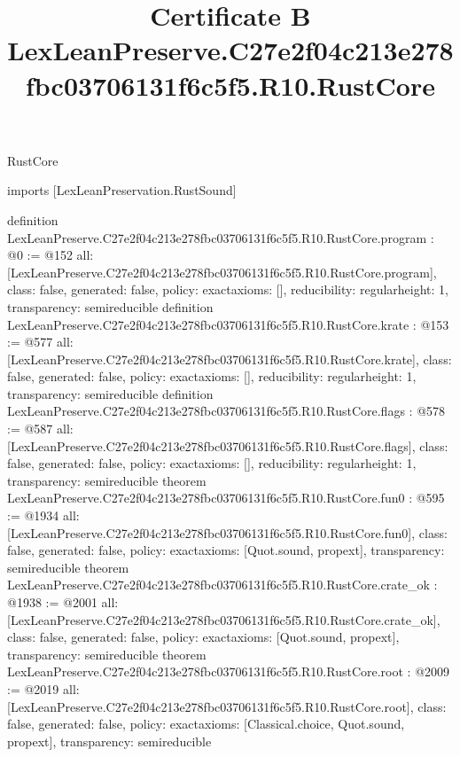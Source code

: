 \begin{lexlean}{RustCore}
\title{Certificate B LexLeanPreserve.C27e2f04c213e278fbc03706131f6c5f5.R10.RustCore}
\begin{coremodule}
imports [LexLeanPreservation.RustSound]

definition LexLeanPreserve.C27e2f04c213e278fbc03706131f6c5f5.R10.RustCore.program : @0 := @152 {
  all: [LexLeanPreserve.C27e2f04c213e278fbc03706131f6c5f5.R10.RustCore.program],
  class: false,
  generated: false,
  policy: exact{axioms: []},
  reducibility: regular{height: 1},
  transparency: semireducible
}
definition LexLeanPreserve.C27e2f04c213e278fbc03706131f6c5f5.R10.RustCore.krate : @153 := @577 {
  all: [LexLeanPreserve.C27e2f04c213e278fbc03706131f6c5f5.R10.RustCore.krate],
  class: false,
  generated: false,
  policy: exact{axioms: []},
  reducibility: regular{height: 1},
  transparency: semireducible
}
definition LexLeanPreserve.C27e2f04c213e278fbc03706131f6c5f5.R10.RustCore.flags : @578 := @587 {
  all: [LexLeanPreserve.C27e2f04c213e278fbc03706131f6c5f5.R10.RustCore.flags],
  class: false,
  generated: false,
  policy: exact{axioms: []},
  reducibility: regular{height: 1},
  transparency: semireducible
}
theorem LexLeanPreserve.C27e2f04c213e278fbc03706131f6c5f5.R10.RustCore.fun0 : @595 := @1934 {
  all: [LexLeanPreserve.C27e2f04c213e278fbc03706131f6c5f5.R10.RustCore.fun0],
  class: false,
  generated: false,
  policy: exact{axioms: [Quot.sound, propext]},
  transparency: semireducible
}
theorem LexLeanPreserve.C27e2f04c213e278fbc03706131f6c5f5.R10.RustCore.crate_ok : @1938 := @2001 {
  all: [LexLeanPreserve.C27e2f04c213e278fbc03706131f6c5f5.R10.RustCore.crate_ok],
  class: false,
  generated: false,
  policy: exact{axioms: [Quot.sound, propext]},
  transparency: semireducible
}
theorem LexLeanPreserve.C27e2f04c213e278fbc03706131f6c5f5.R10.RustCore.root : @2009 := @2019 {
  all: [LexLeanPreserve.C27e2f04c213e278fbc03706131f6c5f5.R10.RustCore.root],
  class: false,
  generated: false,
  policy: exact{axioms: [Classical.choice, Quot.sound, propext]},
  transparency: semireducible
}


\end{coremodule}
\end{lexlean}
